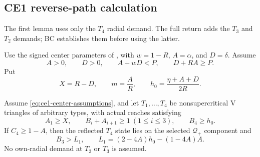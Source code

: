 \subsection{CE1 reverse-path calculation}

\label{subsec:new-ce1-direct-certificate}

The first lemma uses only the $T_4$ radial demand. The full return adds
the $T_3$ and $T_2$ demands; BC establishes them before using the latter.

Use the signed center parameters of ,
with $w=1-R$, $A=\alpha$, and $D=\delta$.
Assume
\begin{equation}
 A>0,
 \qquad D>0,
 \qquad A+wD<P,
 \qquad D+RA\ge P.
 \label{eq:ce1-center-assumptions}
\end{equation}
Put
\begin{equation}
 X=R-D,
 \qquad m=\frac AR,
 \qquad h_0=\frac{\eta+A+D}{2R}.
 \label{eq:ce1-auxiliary-parameters}
\end{equation}

\begin{lemma}
\label{lem:ce1-first-return-step}
Assume \eqref{eq:ce1-center-assumptions}, and let
$T_1,\ldots,T_4$ be nonsupercritical V triangles of arbitrary types,
with actual reaches satisfying
\begin{equation}
 A_1\ge X,\qquad B_i+A_{i+1}\ge1\ (1\le i\le3),\qquad B_4\ge h_0.
 \label{eq:ce1-b4-floor}
\end{equation}
If $C_4\ge1-A$, then the reflected $T_4$ state lies on the selected
$\mathcal Q_+$ component and
\begin{equation}
 B_3>L_1,\qquad L_1=(2-4A)h_0-(1-4A)A.
 \label{eq:ce1-first-chord}
\end{equation}
No own-radial demand at $T_2$ or $T_3$ is assumed.
\end{lemma}

